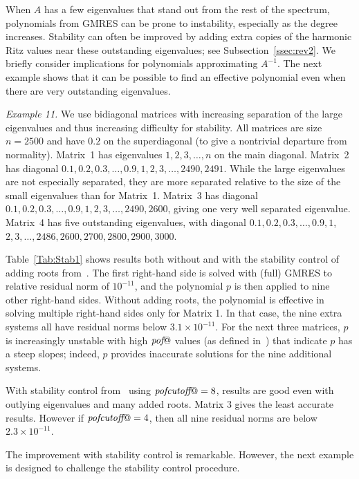 \documentclass{siamart}
\makeatletter
\def\pof{\mbox{{\it pof}}@}
\def\pofcutoff{\mbox{{\it pofcutoff}}@}
\makeatother
\begin{document}
When $A$ has a few eigenvalues that stand out from the rest of the spectrum, polynomials from GMRES can be prone to instability, especially as the degree increases.
Stability can often be improved by adding extra copies of the harmonic Ritz values near these outstanding eigenvalues; see Subsection~\ref{ssec:rev2}.  
We briefly consider implications for polynomials approximating $A^{-1}$.  The next example shows that it can be possible to find an effective polynomial even when there are very outstanding eigenvalues.

{\it Example 11.}
We use bidiagonal matrices with increasing separation of the large eigenvalues and thus increasing difficulty for stability.  All matrices are size $n=2500$ and have $0.2$ on the superdiagonal (to give a nontrivial departure from normality). Matrix~1 has eigenvalues $1, 2, 3, \ldots, n$ on the main diagonal.  Matrix~2 has diagonal $0.1, 0.2, 0.3, \ldots, 0.9, 1, 2, 3, \ldots, 2490, 2491$.  
While the large eigenvalues are not especially separated, they are more separated relative to the size of the small eigenvalues than for Matrix~1.  
Matrix~3 has diagonal $0.1, 0.2, 0.3, \ldots, 0.9, 1, 2, 3, \ldots, 2490, 2600$, giving one very well separated eigenvalue.  Matrix~4 has five outstanding eigenvalues, with diagonal  $0.1, 0.2, 0.3, \ldots, 0.9, 1$, $2, 3, \ldots, 2486, 2600, 2700, 2800, 2900, 3000$.

Table~\ref{Tab:Stab1} shows results both without and with the stability control of adding roots from~\cite[alg.~2]{PPGStable}.  The first right-hand side is solved with (full) GMRES to relative residual norm of $10^{-11}$, and the polynomial $p$ is then applied to nine other right-hand sides.  Without adding roots, the polynomial is effective in solving multiple right-hand sides only for Matrix 1.  In that case, the nine extra systems all have residual norms below $3.1\times 10^{-11}$.
For the next three matrices, $p$ is increasingly unstable with high $\pof$ values (as defined in~\cite[alg.~2]{PPGStable}) that indicate $p$ has a steep slopes; indeed, $p$ provides inaccurate solutions for the nine additional systems.

With stability control from~\cite[alg.~2]{PPGStable} using $\pofcutoff = 8$, results are good even with outlying eigenvalues and many added roots.  Matrix 3 gives the least accurate results.  However if $\pofcutoff = 4$, then all nine residual norms are below $2.3\times 10^{-11}$.  

The improvement with stability control is remarkable.  However, the next example is designed to challenge the stability control procedure.
\end{document}
